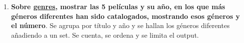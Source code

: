\documentclass[a4paper,onecolumn]{article}
\begin{document}
\begin{sloppypar}
\begin{enumerate}
\begin{figure}[H]
\begin{subfigure}[b]{0.3\textwidth}
        \end{subfigure}
   \end{figure}
   \newpage
    \item \textbf{Sobre \underline{genres}, mostrar las 5 películas y su año, en los que más géneros diferentes han sido catalogados, mostrando esos géneros y el número}.
    Se agrupa por título y año y se hallan los géneros diferentes añadiendo a un set. Se cuenta, se ordena y se limita el output.
    \begin{figure}[H]
        \begin{subfigure}[b]{.6\textwidth}
            \centering

\end{subfigure}
\end{figure}
\end{enumerate}
\end{sloppypar}
\end{document}
